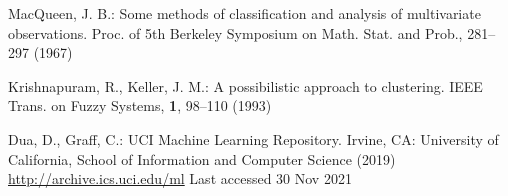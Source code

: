 \documentclass{ujarticle}
\begin{document}
\begin{thebibliography}{99}
MacQueen, J. B.: Some methods of classification and analysis of multivariate observations. Proc. of 5th Berkeley Symposium on Math. Stat. and Prob., 281--297 (1967)

Krishnapuram, R., Keller, J. M.: A possibilistic approach to clustering. IEEE Trans. on Fuzzy Systems,  \textbf{1}, 98--110 (1993)

Dua, D., Graff, C.: UCI Machine Learning Repository. Irvine, CA: University of California, School of Information and Computer Science (2019)  \url{http://archive.ics.uci.edu/ml} Last accessed 30 Nov 2021

\end{thebibliography}
\end{document}
